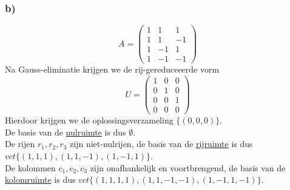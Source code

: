 \documentclass[lineaire_algebra_oplossingen.tex]{subfiles}
\begin{document}
\subsubsection*{b)}
\[ A =
\begin{pmatrix}
  1 & 1 & 1\\
  1 & 1 & -1\\
  1 & -1 & 1\\
  1 & -1 & -1
\end{pmatrix}
\]
Na Gauss-eliminatie krijgen we de rij-gereduceeerde vorm
\[ U =
\begin{pmatrix}
  1 & 0 & 0\\
  0 & 1 & 0\\
  0 & 0 & 1\\
  0 & 0 & 0
\end{pmatrix}
\]
Hierdoor krijgen we de oplossingsverzameling $\{(0,0,0)\}$.\\
De basis van de \underline{nulruimte} is dus $\emptyset$.\\
De rijen $r_1, r_2, r_3$ zijn niet-nulrijen, de basis van de \underline{rijruimte} is dus $vct\{(1,1,1), (1,1,-1), (1,-1,1)\}$.\\
De kolommen $c_1, c_2, c_3$ zijn onafhankelijk en voortbrengend, de basis van de \underline{kolomruimte} is dus $vct\{(1,1,1,1), (1,1,-1,-1), (1,-1,1,-1)\}$.
\end{document}
